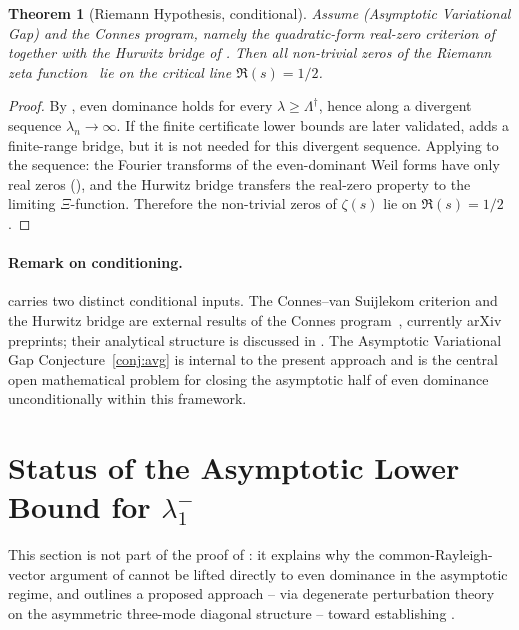 \documentclass[11pt,a4paper]{article}
\newtheorem{theorem}{Theorem}[section]
\theoremstyle{remark}
\theoremstyle{plain}
\begin{document}
\begin{theorem}[Riemann Hypothesis, conditional]
\label{thm:rh}
Assume  (Asymptotic Variational Gap) and the Connes program,
namely the quadratic-form real-zero criterion of~\cite{ConnesvS2025} together
with the Hurwitz bridge of \cite[Fact~6.4 and Section~6.4--6.6]{Connes2026}.
Then all non-trivial zeros of the Riemann zeta function~\cite{Riemann1859}
lie on the critical line $\Re(s)=1/2$.
\end{theorem}

\begin{proof}
By , even dominance holds for every
$\lambda\geq\Lambda^\dagger$, hence along a divergent sequence
$\lambda_n\to\infty$. If the finite certificate lower bounds are later validated,
 adds a finite-range bridge, but it is not needed for this
divergent sequence. Applying  to the sequence: the Fourier
transforms of the even-dominant Weil forms have only real zeros
(), and the Hurwitz bridge transfers the real-zero property
to the limiting $\Xi$-function. Therefore the non-trivial zeros of $\zeta(s)$
lie on $\Re(s)=1/2$.
\end{proof}

\paragraph{Remark on conditioning.}
 carries two distinct conditional inputs. The Connes--van
Suijlekom criterion and the Hurwitz bridge are external results of the Connes
program~\cite{Connes2026,ConnesvS2025}, currently arXiv preprints; their
analytical structure is discussed in . The
Asymptotic Variational Gap Conjecture~\ref{conj:avg} is internal to the
present approach and is the central open mathematical problem for closing
the asymptotic half of even dominance unconditionally within this framework.

\section{Status of the Asymptotic Lower Bound for \texorpdfstring{$\lambda_1^-$}{lambda\_1\^{}-}}
\label{sec:asymptotic-lower-bound}

This section is not part of the proof of : it explains why the
common-Rayleigh-vector argument of  cannot be
lifted directly to even dominance in the asymptotic regime, and outlines a
proposed approach -- via degenerate perturbation theory on the asymmetric
three-mode diagonal structure -- toward establishing .
\end{document}
